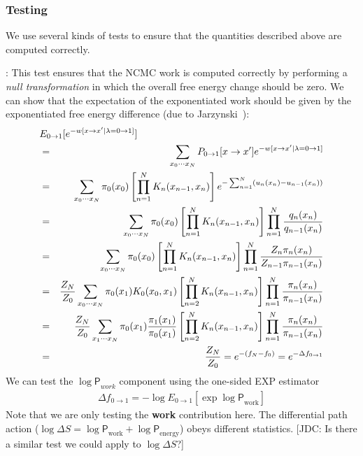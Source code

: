 \documentclass[aps,pre,twocolumn,nofootinbib,superscriptaddress,linenumbers,11point]{revtex4-1}
\newcommand{\logP}{{\log \mathsf{P}}}
\begin{document}
\subsubsection*{Testing}

We use several kinds of tests to ensure that the quantities described above are computed correctly.

: This test ensures that the NCMC work is computed correctly by performing a \emph{null transformation} in which the overall free energy change should be zero.
We can show that the expectation of the exponentiated work should be given by the exponentiated free energy difference (due to Jarzynski~\cite{jarzynski:prl:1997:neq-fe}):
\begin{eqnarray}
\lefteqn{E_{0 \rightarrow 1}[e^{-w[x \rightarrow x' | \lambda = 0 \rightarrow 1]}]} \nonumber \\ 
&=& \sum_{x_0\cdots x_N} P_{0 \rightarrow 1}[x \rightarrow x'] e^{-w[x \rightarrow x' | \lambda = 0 \rightarrow 1]} \nonumber \\
&=& \sum_{x_0\cdots x_N} \pi_0(x_0) \left[ \prod_{n=1}^N K_n(x_{n-1}, x_n) \right] e^{- \sum_{n=1}^N (u_{n}(x_n) - u_{n-1}(x_n))} \nonumber \\
&=& \sum_{x_0\cdots x_N}  \pi_0(x_0) \left[ \prod_{n=1}^N K_n(x_{n-1}, x_n) \right] \prod_{n=1}^N \frac{q_n(x_n)}{q_{n-1}(x_n)} \nonumber \\
&=& \sum_{x_0\cdots x_N} \pi_0(x_0) \left[ \prod_{n=1}^N K_n(x_{n-1}, x_n) \right] \prod_{n=1}^N \frac{Z_n \pi_n(x_n)}{Z_{n-1} \pi_{n-1}(x_n)} \nonumber \\
&=& \frac{Z_N}{Z_0} \sum_{x_0\cdots x_N} \pi_0(x_1) K_0(x_0, x_1) \left[ \prod_{n=2}^N K_n(x_{n-1}, x_n) \right] \prod_{n=1}^N \frac{\pi_n(x_n)}{\pi_{n-1}(x_n)} \nonumber \\
&=& \frac{Z_N}{Z_0} \sum_{x_1\cdots x_N} \pi_0(x_1) \frac{\pi_1(x_1)}{\pi_0(x_1)} \left[ \prod_{n=2}^N K_n(x_{n-1}, x_n) \right] \prod_{n=1}^N \frac{\pi_n(x_n)}{\pi_{n-1}(x_n)} \nonumber \\
&=& \frac{Z_N}{Z_0} = e^{-(f_N - f_0)} = e^{-\Delta f_{0 \rightarrow 1}}
\end{eqnarray}
We can test the $\logP_{work}$ component using the one-sided EXP estimator
\begin{eqnarray}
\Delta f_{0 \rightarrow 1} = - \log E_{0 \rightarrow 1}\left[ \exp{\logP_\mathrm{work}} \right] 
\end{eqnarray}
Note that we are only testing the {\bf work} contribution here.
The differential path action ($\log \Delta S = \logP_\mathrm{work} + \logP_\mathrm{energy}$) obeys different statistics.
{\color{red}[JDC: Is there a similar test we could apply to $\log \Delta S$?]}
\end{document}
